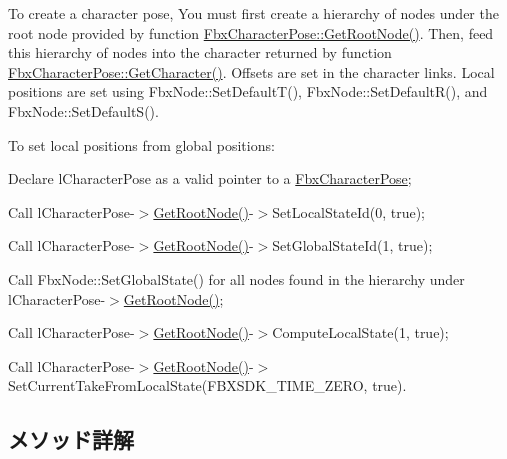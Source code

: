 To create a character pose, You must first create a hierarchy of nodes under the root node provided by function \hyperlink{class_fbx_character_pose_a7dd8f39dcef2c74844a3d367a67a681b}{Fbx\+Character\+Pose\+::\+Get\+Root\+Node()}. Then, feed this hierarchy of nodes into the character returned by function \hyperlink{class_fbx_character_pose_ac0429f7f15902a3eeb0c50e890529cde}{Fbx\+Character\+Pose\+::\+Get\+Character()}. Offsets are set in the character links. Local positions are set using Fbx\+Node\+::\+Set\+Default\+T(), Fbx\+Node\+::\+Set\+Default\+R(), and Fbx\+Node\+::\+Set\+Default\+S().

To set local positions from global positions\+:
\begin{DoxyEnumerate}
\item Declare l\+Character\+Pose as a valid pointer to a \hyperlink{class_fbx_character_pose}{Fbx\+Character\+Pose};
\item Call l\+Character\+Pose-\/$>$\hyperlink{class_fbx_character_pose_a7dd8f39dcef2c74844a3d367a67a681b}{Get\+Root\+Node()}-\/$>$Set\+Local\+State\+Id(0, true);
\item Call l\+Character\+Pose-\/$>$\hyperlink{class_fbx_character_pose_a7dd8f39dcef2c74844a3d367a67a681b}{Get\+Root\+Node()}-\/$>$Set\+Global\+State\+Id(1, true);
\item Call Fbx\+Node\+::\+Set\+Global\+State() for all nodes found in the hierarchy under l\+Character\+Pose-\/$>$\hyperlink{class_fbx_character_pose_a7dd8f39dcef2c74844a3d367a67a681b}{Get\+Root\+Node()};
\item Call l\+Character\+Pose-\/$>$\hyperlink{class_fbx_character_pose_a7dd8f39dcef2c74844a3d367a67a681b}{Get\+Root\+Node()}-\/$>$Compute\+Local\+State(1, true);
\item Call l\+Character\+Pose-\/$>$\hyperlink{class_fbx_character_pose_a7dd8f39dcef2c74844a3d367a67a681b}{Get\+Root\+Node()}-\/$>$Set\+Current\+Take\+From\+Local\+State(\+F\+B\+X\+S\+D\+K\+\_\+\+T\+I\+M\+E\+\_\+\+Z\+E\+R\+O, true). 
\end{DoxyEnumerate}

\subsection{メソッド詳解}
\mbox{\label{class_fbx_character_pose_af191f8d48c8f11e795adcb92adae35c5}} 
